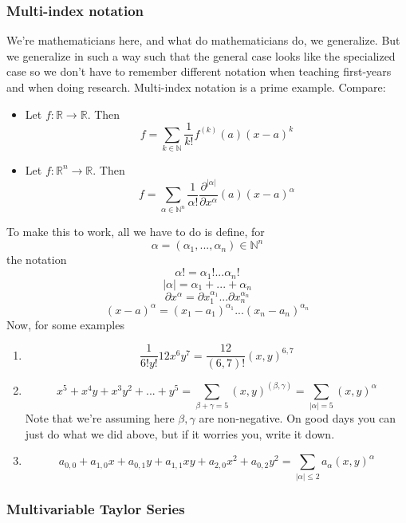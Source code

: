 \documentclass{article}
\newcommand{\reals}[0]{\mathbb{R}}
\newcommand{\nats}[0]{\mathbb{N}}
\begin{document}
\subsubsection{Multi-index notation}
We're mathematicians here, and what do mathematicians do, we generalize. But we generalize in such a way such that the general case looks like the specialized case so we don't have to remember different notation when teaching first-years and when doing research. Multi-index notation is a prime example. Compare:
\begin{itemize}

  \item Let \(f: \reals \to \reals\). Then
  \[f = \sum_{k \in \nats}\frac{1}{k!}f^{(k)}(a)(x - a)^k\]

  \item Let \(f: \reals^n \to \reals\). Then
  \[f = \sum_{\alpha \in \nats^n}\frac{1}{\alpha!}\frac{\partial^{|\alpha|}}{\partial x^\alpha}(a)(x - a)^\alpha\]

\end{itemize}
To make this to work, all we have to do is define, for
\[\alpha = (\alpha_1,...,\alpha_n) \in \nats^n\]
the notation
\[\alpha! = \alpha_1!...\alpha_n!\]
\[|\alpha| = \alpha_1 + ... + \alpha_n\]
\[\partial x^\alpha = \partial x_1^{\alpha_1} ... \partial x_n^{\alpha_n}\]
\[(x - a)^\alpha = (x_1 - a_1)^{\alpha_1}...(x_n - a_n)^{\alpha_n}\]
Now, for some examples
\begin{enumerate}

  \item
  \[\frac{1}{6!y!}12x^6y^7 = \frac{12}{(6, 7)!}(x, y)^{6, 7}\]

  \item
  \[x^5 + x^4y + x^3y^2 + ... + y^5 = \sum_{\beta + \gamma = 5}(x, y)^{(\beta, \gamma)} = \sum_{|\alpha| = 5}(x, y)^\alpha\]
  Note that we're assuming here \(\beta, \gamma\) are non-negative. On good days you can just do what we did above, but if it worries you, write it down.

  \item
  \[a_{0, 0} + a_{1, 0}x + a_{0, 1}y + a_{1, 1}xy + a_{2, 0}x^2 + a_{0, 2}y^2 = \sum_{|\alpha| \leq 2}a_{\alpha}(x, y)^{\alpha}\]

\end{enumerate}

\subsubsection{Multivariable Taylor Series}
\end{document}
